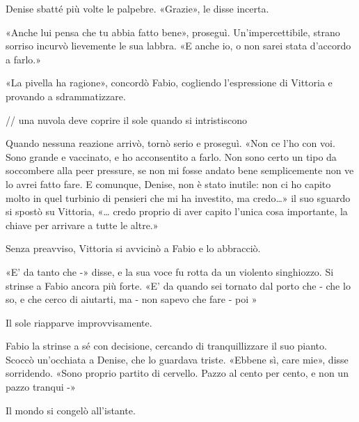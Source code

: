 Denise sbatté più volte le palpebre. «Grazie», le disse incerta.

«Anche lui pensa che tu abbia fatto bene», proseguì. Un'impercettibile,
strano sorriso incurvò lievemente le sua labbra. «E anche io, o non
sarei stata d'accordo a farlo.»

«La pivella ha ragione», concordò Fabio, cogliendo l'espressione di
Vittoria e provando a sdrammatizzare.

// una nuvola deve coprire il sole quando si intristiscono

Quando nessuna reazione arrivò, tornò serio e proseguì. «Non ce l'ho con
voi. Sono grande e vaccinato, e ho acconsentito a farlo. Non sono certo
un tipo da soccombere alla peer pressure, se non mi fosse andato bene
semplicemente non ve lo avrei fatto fare. E comunque, Denise, non è
stato inutile: non ci ho capito molto in quel turbinio di pensieri che
mi ha investito, ma credo\ldots{}» il suo sguardo si spostò su Vittoria,
«\ldots{} credo proprio di aver capito l'unica cosa importante, la
chiave per arrivare a tutte le altre.»

Senza preavviso, Vittoria si avvicinò a Fabio e lo abbracciò.

«E' da tanto che -» disse, e la sua voce fu rotta da un violento
singhiozzo. Si strinse a Fabio ancora più forte. «E' da quando sei
tornato dal porto che - che lo so, e che cerco di aiutarti, ma - non
sapevo che fare - poi »

Il sole riapparve improvvisamente.

Fabio la strinse a sé con decisione, cercando di tranquillizzare il suo
pianto. Scoccò un'occhiata a Denise, che lo guardava triste. «Ebbene sì,
care mie», disse sorridendo. «Sono proprio partito di cervello. Pazzo al
cento per cento, e non un pazzo tranqui -»

Il mondo si congelò all'istante.
